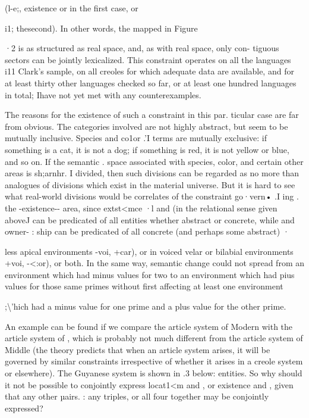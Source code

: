 (l-e;, existence or  in the first case,  or 

i1; thesecond). In other words, the  mapped in Figure

·2 is as structured as real space, and, as with real space, only con- tiguous sectors can be jointly lexicalized. This constraint operates on all the languages i11 Clark's sample, on all creoles for which adequate
data are available, and for at least thirty other languages checked so far, or at least one hundred languages in total; Ihave not yet met with any counterexamples.

The reasons for the existence of such a constraint in this par. ticular case are far from obvious. The categories involved are not
highly abstract, but seem to be mutually inclusive. Species and co1or .'I terms are mutually exclusive: if something is a cat, it is not a dog; if something is red, it is not yellow or blue, and so on. If the semantic . space associated with species, color, and certain other areas is sh;arnhr. I divided, then such divisions can be regarded as no more than analogues
of divisions which exist in the material universe. But it is hard to see what real{}-world divisions would be correlates of the constraint go·vern• .I ing . the -existence-- area, since extst{\textless}mce ·l and  (in the relational sense given aboveJ can be predicated
of all entities whether abstract or concrete, while  and owner- : ship can be predicated of all concrete (and perhaps some abstract) ·


less apical environments {}-voi, +car), or in voiced velar or bilabial environments +voi, {}-{\textless}:or), or both. In the same way, semantic change could not spread from an environment which had minus values for two  to an environment which had pius values for those same primes without first affecting at least one environment

;{\textbackslash}'hich had a minus value for one prime and a plus value for the other
prime.

An example can be found if we compare the article system of Modern  with the article system of , which is probably not much different from the article system of Middle  (the theory predicts that when an article system arises, it will be governed by similar constraints irrespective of whether it arises in a creole system or elsewhere). The Guyanese system is shown in .3 below:
entities. So why should it not be possible to conjointly express locat1{\textless}m and , or existence and , given that any other µairs. : any triples, or all four together may be conjointly expressed?

